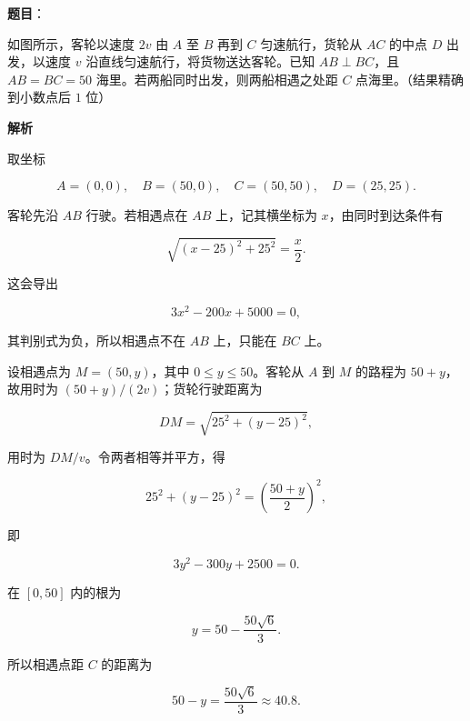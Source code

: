 \begin{answer}

\textbf{题目}：

如图所示，客轮以速度 $2v$ 由 $A$ 至 $B$ 再到 $C$ 匀速航行，货轮从 $AC$ 的中点 $D$ 出发，以速度 $v$ 沿直线匀速航行，将货物送达客轮。已知 $AB\perp BC$，且 $AB=BC=50$ 海里。若两船同时出发，则两船相遇之处距 $C$ 点\gkblank{}海里。（结果精确到小数点后 $1$ 位）
\nopagebreak[4]
\begin{center}\end{center}
\nopagebreak[4]
\textbf{解析}

取坐标

\nopagebreak[4]
\[
A=(0,0),\quad B=(50,0),\quad C=(50,50),\quad D=(25,25).
\]

客轮先沿 $AB$ 行驶。若相遇点在 $AB$ 上，记其横坐标为 $x$，由同时到达条件有

\nopagebreak[4]
\[
\sqrt{(x-25)^2+25^2}=\frac{x}{2}.
\]

这会导出

\nopagebreak[4]
\[
3x^2-200x+5000=0,
\]

其判别式为负，所以相遇点不在 $AB$ 上，只能在 $BC$ 上。

设相遇点为 $M=(50,y)$，其中 $0\le y\le50$。客轮从 $A$ 到 $M$ 的路程为 $50+y$，故用时为 $(50+y)/(2v)$；货轮行驶距离为

\nopagebreak[4]
\[
DM=\sqrt{25^2+(y-25)^2},
\]

用时为 $DM/v$。令两者相等并平方，得

\nopagebreak[4]
\[
25^2+(y-25)^2=\left(\frac{50+y}{2}\right)^2,
\]

即

\nopagebreak[4]
\[
3y^2-300y+2500=0.
\]

在 $[0,50]$ 内的根为

\nopagebreak[4]
\[
y=50-\frac{50\sqrt6}{3}.
\]

所以相遇点距 $C$ 的距离为

\nopagebreak[4]
\[
50-y=\frac{50\sqrt6}{3}\approx40.8.
\]


\end{answer}
